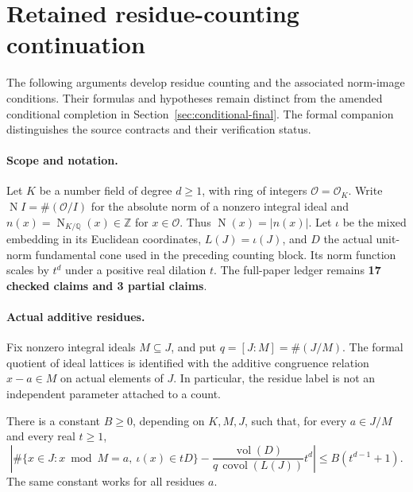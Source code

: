 \clearpage
\section{Retained residue-counting continuation}
\label{sec:historical-residue-continuation}
The following arguments develop residue counting and the associated norm-image conditions. Their formulas and hypotheses remain distinct from the amended conditional completion in Section~\ref{sec:conditional-final}. The formal companion distinguishes the source contracts and their verification status.
\providecommand{\OO}{\mathcal O}
\providecommand{\ZZ}{\mathbb Z}
\providecommand{\RR}{\mathbb R}
\providecommand{\CC}{\mathbb C}
\providecommand{\NN}{\mathbb N}
\providecommand{\Cl}{\operatorname{Cl}}
\providecommand{\Nm}{\operatorname N}
\providecommand{\vol}{\operatorname{vol}}
\providecommand{\covol}{\operatorname{covol}}
\providecommand{\absn}[1]{\lvert #1\rvert}




\paragraph{Scope and notation.}
Let $K$ be a number field of degree $d\geq1$, with ring of integers
$\OO=\OO_K$. Write $\Nm I=\#(\OO/I)$ for the absolute norm of a nonzero
integral ideal and $n(x)=\Nm_{K/\mathbb Q}(x)\in\ZZ$ for $x\in\OO$.
Thus $\Nm(x)=\absn{n(x)}$. Let $\iota$ be the mixed embedding in its
Euclidean coordinates, $L(J)=\iota(J)$, and $D$ the actual unit-norm
fundamental cone used in the preceding counting block. Its norm function
scales by $t^d$ under a positive real dilation $t$.
The full-paper ledger remains \textbf{17 checked claims and 3 partial claims}.

\paragraph{Actual additive residues.}
Fix nonzero integral ideals $M\subseteq J$, and put $q=[J:M]=\#(J/M)$.
The formal quotient of ideal lattices is identified with the additive
congruence relation $x-a\in M$ on actual elements of $J$. In particular,
the residue label is not an independent parameter attached to a count.

\begin{proposition}\label{prop:residue-count}
There is a constant $B\geq0$, depending on $K,M,J$, such that, for every
$a\in J/M$ and every real $t\geq1$,
\[
 \left|\#\{x\in J:x\bmod M=a,\ \iota(x)\in tD\}
 -\frac{\vol(D)}{q\,\covol(L(J))}t^d\right|
 \leq B(t^{d-1}+1).
\]
The same constant works for all residues $a$.
\end{proposition}

